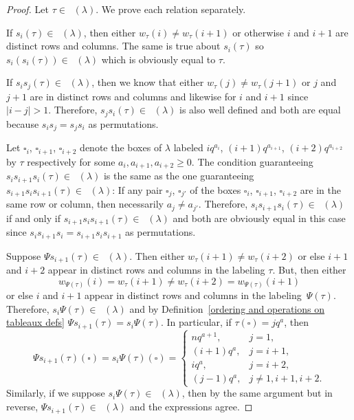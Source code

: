 \documentclass[pdftex]{sigma}
\numberwithin{equation}{section}
\theoremstyle{definition}
\DeclareMathOperator{\PSYT}{\mathrm{PSYT}_{\geq 0}}
\begin{document}
\begin{proof}
Let $\tau \in \PSYT(\lambda)$. We prove each relation separately.

If $s_i(\tau) \in \PSYT(\lambda)$, then either $w_{\tau}(i) \neq w_{\tau}(i+1)$ or otherwise $i$ and $i+1$ are distinct rows and columns. The same is true about $s_i(\tau)$ so $s_i(s_i(\tau)) \in \PSYT(\lambda)$ which is obviously equal to $\tau$.

If $s_is_j(\tau) \in \PSYT(\lambda)$, then we know that either $w_{\tau}(j) \neq w_{\tau}(j+1)$ or $j$ and $j+1$ are in distinct rows and columns and likewise for $i$ and $i+1$ since $|i-j| > 1$. Therefore, $s_js_i(\tau) \in \PSYT(\lambda)$ is also well defined and both are equal because $s_is_j = s_js_i$ as permutations.

Let $\square_i$, $\square_{i+1}$, $\square_{i+2}$ denote the boxes of $\lambda$ labeled $iq^{a_i}$, $(i+1)q^{a_{i+1}}$, $(i+2)q^{a_{i+2}}$ by $\tau$ respectively for some $a_i,a_{i+1},a_{i+2} \geq 0$. The condition guaranteeing $s_is_{i+1}s_i(\tau) \in \PSYT(\lambda)$ is the same as the one guaranteeing $s_{i+1}s_is_{i+1}(\tau) \in \PSYT(\lambda)$: If any pair $\square_j$, $\square_{j'}$ of the boxes $\square_i$, $\square_{i+1}$, $\square_{i+2}$ are in the same row or column, then necessarily $a_{j} \neq a_{j'}$. Therefore, $s_is_{i+1}s_i(\tau)\in \PSYT(\lambda)$ if and only if $s_{i+1}s_is_{i+1}(\tau) \in \PSYT(\lambda)$ and both are obviously equal in this case since $s_{i}s_{i+1}s_{i} = s_{i+1}s_is_{i+1}$ as permutations.

Suppose $\Psi s_{i+1}(\tau) \in \PSYT(\lambda)$. Then either $w_{\tau}(i+1) \neq w_{\tau}(i+2)$ or else $i+1$ and $i+2$ appear in distinct rows and columns in the labeling $\tau$. But, then either
\[w_{\Psi(\tau)}(i) = w_{\tau}(i+1) \neq w_{\tau}(i+2)= w_{\Psi(\tau)}(i+1)
\]
 or else $i$ and $i+1$ appear in distinct rows and columns in the labeling~$\Psi(\tau)$. Therefore, $s_i\Psi(\tau) \in \PSYT(\lambda)$ and by Definition~\ref{ordering and operations on tableaux defs} $\Psi s_{i+1}(\tau) = s_i\Psi(\tau)$. In particular, if $\tau(\square) = jq^a$, then
\[
 \Psi s_{i+1}(\tau)(\square)=s_i\Psi(\tau)(\square) = \begin{cases}
 nq^{a+1}, & j=1 ,\\
 (i+1)q^{a}, & j=i+1,\\
 iq^a ,& j =i+2, \\
 (j-1)q^a, & j\neq 1,i+1,i+2 .
\end{cases}
\]
 Similarly, if we suppose $s_i\Psi(\tau) \in \PSYT(\lambda)$, then by the same argument but in reverse, $\Psi s_{i+1}(\tau) \in \PSYT(\lambda)$ and the expressions agree.


\end{proof}
\end{document}
